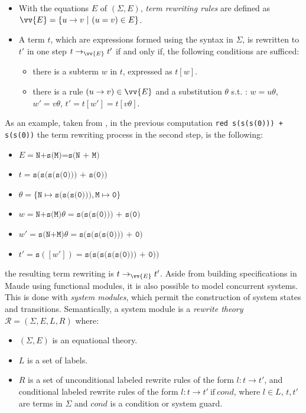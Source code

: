 \begin{itemize}
    \item With the equations $E$ of $(\Sigma, E)$, \textit{term rewriting rules} are defined as $\vv{E} = \{u \rightarrow v  \ | \ (u = v) \in E \}$. 
    \item A term $t$, which are expressions formed using the syntax in $\Sigma$, is rewritten to $t'$ in one step $t \rightarrow_{\vv{E}} t'$ if and only if, the following conditions are sufficed:
        \begin{itemize}
            \item there is a subterm $w$ in $t$, expressed as $t[w]$.
            \item there is a rule $(u \rightarrow v) \in \vv{E}$ and a substitution $\theta$ s.t. : $w = u\theta$, $w' = v\theta$, $t'=t[w']=t[v\theta]$.   
        \end{itemize}
\end{itemize}
As an example, taken from \cite{Lecture1}, in the previous computation \texttt{red s(s(s(0))) + s(s(0))} the term rewriting process in the second step, is the following:
\begin{itemize}
    \item $E = \texttt{N+s(M)=s(N + M)}$
    \item $t = \texttt{s(s(s(s(0))) + s(0))}$
    \item $\theta = \{\texttt{N} \mapsto \texttt{s(s(s(0)))},\texttt{M} \mapsto \texttt{0} \}$
    \item $w = \texttt{N+s(M)}\theta = \texttt{s(s(s(0))) + s(0)}$
    \item $w' = \texttt{s(N+M)}\theta = \texttt{s(s(s(s(0))) + 0)}$
    \item $t' = \texttt{s}([w']) = \texttt{s(s(s(s(s(0))) + 0))}$
\end{itemize}
the resulting term rewriting is $t \rightarrow_{\vv{E}} t'$.
Aside from building specifications in Maude using functional modules, it is also possible to model concurrent systems. This is done with \textit{system modules}, which permit the construction of system states and transitions. Semantically, a system module is a \textit{rewrite theory} \cite{PeterMaude,Lecture3} $\mathscr{R} = (\Sigma, E, L, R)$ where: 
\begin{itemize}
    \item $(\Sigma, E)$ is an equational theory.
    \item $L$ is a set of labels.
    \item $R$ is a set of unconditional labeled rewrite rules of the form $l: t \rightarrow t'$, and conditional labeled rewrite rules of the form $l: t \rightarrow t' \ \text{if} \ cond$, where $l \in L$, $t,t'$ are terms in $\Sigma$ and $cond$ is a condition or system guard.    
\end{itemize}
